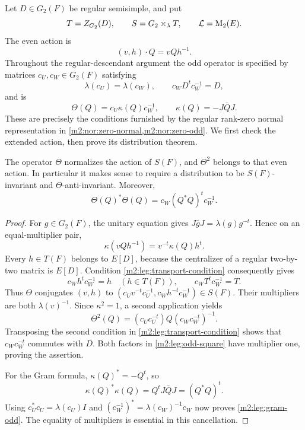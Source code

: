 Let $D\in G_2(F)$ be regular semisimple, and put
\[
 T=Z_{G_2}(D),\qquad S=G_2\times_{\lambda}T,
 \qquad \mathcal L=\operatorname{M}_2(E).
\]
The even action is
\begin{equation}\label{m2:leg:action}
 (v,h)\cdot Q=vQh^{-1}.
\end{equation}
Throughout the regular-descendant argument the odd operator is specified by matrices
$c_U,c_W\in G_2(F)$ satisfying
\begin{equation}\label{m2:leg:transport-condition}
 \lambda(c_U)=\lambda(c_W),\qquad c_WD^tc_W^{-1}=D,
\end{equation}
and is
\begin{equation}\label{m2:leg:odd}
 \Theta(Q)=c_U\kappa(Q)c_W^{-1},
 \qquad \kappa(Q)=-J\bar QJ.
\end{equation}
These are precisely the conditions furnished by the regular rank-zero
normal representation in \cref{m2:nor:zero-normal,m2:nor:zero-odd}.
We first check the extended action, then prove its distribution theorem.

\begin{lemma}\label{m2:leg:extended-action}
The operator $\Theta$ normalizes the action of $S(F)$, and $\Theta^2$
belongs to that even action. In particular it makes sense to require a
distribution to be $S(F)$-invariant and $\Theta$-anti-invariant.
Moreover,
\begin{equation}\label{m2:leg:gram-odd}
 \Theta(Q)^*\Theta(Q)=c_W(Q^*Q)^tc_W^{-1}.
\end{equation}
\end{lemma}

\begin{proof}
For $g\in G_2(F)$, the unitary equation gives
$J\bar gJ=\lambda(g)g^{-t}$. Hence on an equal-multiplier pair,
\[
 \kappa(vQh^{-1})=v^{-t}\kappa(Q)h^t.
\]
Every $h\in T(F)$ belongs to $E[D]$, because the centralizer of a
regular two-by-two matrix is $E[D]$.
Condition \eqref{m2:leg:transport-condition} consequently gives
\begin{equation}\label{m2:leg:transpose-centralizer}
 c_Wh^tc_W^{-1}=h\quad(h\in T(F)),\qquad c_WT^tc_W^{-1}=T.
\end{equation}
Thus $\Theta$ conjugates $(v,h)$ to
$(c_Uv^{-t}c_U^{-1},c_Wh^{-t}c_W^{-1})\in S(F)$.
Their multipliers are both $\lambda(v)^{-1}$.
Since $\kappa^2=1$, a second application yields
\begin{equation}\label{m2:leg:odd-square}
 \Theta^2(Q)=(c_Uc_U^{-t})Q(c_Wc_W^{-t})^{-1}.
\end{equation}
Transposing the second condition in \eqref{m2:leg:transport-condition}
shows that $c_Wc_W^{-t}$ commutes with $D$. Both factors in
\eqref{m2:leg:odd-square} have multiplier one, proving the assertion.

For the Gram formula, $\kappa(Q)^*=-Q^t$, so
\[
 \kappa(Q)^*\kappa(Q)=Q^tJ\bar QJ=(Q^*Q)^t.
\]
Using $c_U^*c_U=\lambda(c_U)I$ and
$(c_W^{-1})^*=\lambda(c_W)^{-1}c_W$ now proves
\eqref{m2:leg:gram-odd}. The equality of multipliers is essential in
this cancellation.
\end{proof}

